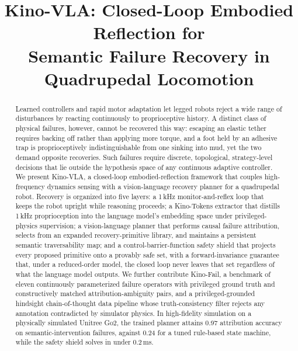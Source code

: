 \documentclass[conference]{IEEEtran}
\newcommand{\kinovla}{Kino-VLA}
\newcommand{\kinofail}{Kino-Fail}
\newcommand{\kinotokens}{Kino-Tokens}
\begin{document}
\title{\kinovla{}: Closed-Loop Embodied Reflection for\\
Semantic Failure Recovery in Quadrupedal Locomotion}

\ifdefined\isanonymous
  \author{
  }
\else
  \author{
  }
\fi

\maketitle

\begin{abstract}
Learned controllers and rapid motor adaptation let legged robots reject a wide
range of disturbances by reacting continuously to proprioceptive history. A
distinct class of physical failures, however, cannot be recovered this way:
escaping an elastic tether requires backing off rather than applying more
torque, and a foot held by an adhesive trap is proprioceptively
indistinguishable from one sinking into mud, yet the two demand opposite
recoveries. Such failures require discrete, topological, strategy-level
decisions that lie outside the hypothesis space of any continuous adaptive
controller. We present \kinovla{}, a closed-loop embodied-reflection framework
that couples high-frequency dynamics sensing with a vision-language recovery
planner for a quadrupedal robot. Recovery is organized into five layers: a
\mbox{1\,kHz} monitor-and-reflex loop that keeps the robot upright while
reasoning proceeds; a \kinotokens{} extractor that distills \mbox{1\,kHz}
proprioception into the language model's embedding space under privileged-physics
supervision; a vision-language planner that performs causal failure attribution,
selects from an expanded recovery-primitive library, and maintains a persistent
semantic traversability map; and a control-barrier-function safety shield that
projects every proposed primitive onto a provably safe set, with a
forward-invariance guarantee that, under a reduced-order model, the closed loop
never leaves that set regardless of what the language model outputs. We further contribute
\kinofail{}, a benchmark of eleven continuously parameterized failure operators
with privileged ground truth and constructively matched attribution-ambiguity
pairs, and a privileged-grounded hindsight chain-of-thought data pipeline whose
truth-consistency filter rejects any annotation contradicted by simulator
physics. In high-fidelity simulation on a physically simulated Unitree Go2, the
trained planner attains \mbox{0.97} attribution accuracy on
semantic-intervention failures, against \mbox{0.24} for a tuned rule-based state
machine, while the safety shield solves in under \mbox{0.2\,ms}.
\end{abstract}
\end{document}
